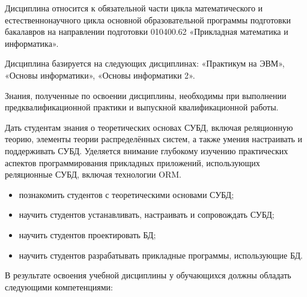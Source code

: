 \documentclass[a4paper]{article}
\begin{document}
\renewcommand{\CourseName}{Базы данных}
\renewcommand{\CourseAuthor}{старший преподаватель кафедры ин\-фор\-ма\-тики,
  математического и компьютерного моделирования А.~С.~Кленин}
\renewcommand{\CourseYear}{1}
\renewcommand{\CourseSemester}{2}
\renewcommand{\CourseLectures}{18}
\renewcommand{\CourseLabs}{54}

\renewcommand{\CourseTotalAuditory}{72}
\renewcommand{\CourseHomework}{54}

\renewcommand{\CourseExamSemester}{2}

\CoursePlanTitlePage
\begin{CoursePlanTitlePageReverse}
  \CourseUpdateRecord
  \CourseUpdateRecord
\end{CoursePlanTitlePageReverse}

\CourseAnnotationSection

Дисциплина относится к обязательной части цикла математического и естественнонаучного цикла
основной образовательной программы подготовки бакалавров на направлении подготовки 010400.62 «Прикладная математика и информатика».

Дисциплина базируется на следующих дисциплинах: «Практикум на ЭВМ», «Основы информатики», «Основы информатики 2».

Знания, полученные по освоении дисциплины, необходимы при выполнении предквалификационной практики и выпускной квалификационной работы.

\CourseGoal

Дать студентам знания о теоретических основах СУБД, включая реляционную теорию, элементы теории распределённых систем,
а также умения настраивать и поддерживать СУБД.
Уделяется внимание глубокому изучению практических аспектов программирования прикладных приложений,
использующих реляционные СУБД, включая технологии ORM.

\CourseTasks
\begin{itemize}
  \item познакомить студентов с теоретическими основами СУБД;
  \item научить студентов устанавливать, настраивать и сопровождать СУБД;
  \item научить студентов проектировать БД;
  \item научить студентов разрабатывать прикладные программы, использующие БД.
\end{itemize}

В результате освоения учебной дисциплины у обучающихся должны обладать следующими компетенциями:
\end{document}
